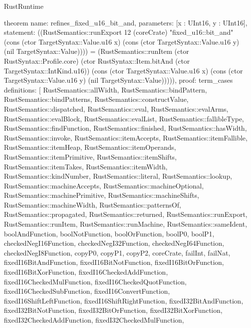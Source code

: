 \begin{lexlean}{RustRuntime}
\begin{semanticmodule}
theorem{
  name: refines_fixed_u16_bit_and,
  parameters: [x : UInt16, y : UInt16],
  statement: ((RustSemantics::runExport 12 (coreCrate) "fixed_u16::bit_and" (cons (ctor TargetSyntax::Value.u16 x) (cons (ctor TargetSyntax::Value.u16 y) (nil TargetSyntax::Value)))) = (RustSemantics::runItem (ctor RustSyntax::Profile.core) (ctor RustSyntax::Item.bitAnd (ctor TargetSyntax::IntKind.u16)) (cons (ctor TargetSyntax::Value.u16 x) (cons (ctor TargetSyntax::Value.u16 y) (nil TargetSyntax::Value))))),
  proof: term_cases{
    definitions: [
      RustSemantics::allWidth,
      RustSemantics::bindPattern,
      RustSemantics::bindPatterns,
      RustSemantics::constructValue,
      RustSemantics::dispatched,
      RustSemantics::eval,
      RustSemantics::evalArms,
      RustSemantics::evalBlock,
      RustSemantics::evalList,
      RustSemantics::fallibleType,
      RustSemantics::findFunction,
      RustSemantics::finished,
      RustSemantics::hasWidth,
      RustSemantics::invoke,
      RustSemantics::itemAccepts,
      RustSemantics::itemFallible,
      RustSemantics::itemHeap,
      RustSemantics::itemOperands,
      RustSemantics::itemPrimitive,
      RustSemantics::itemShifts,
      RustSemantics::itemTakes,
      RustSemantics::itemWidth,
      RustSemantics::kindNumber,
      RustSemantics::literal,
      RustSemantics::lookup,
      RustSemantics::machineAccepts,
      RustSemantics::machineOptional,
      RustSemantics::machinePrimitive,
      RustSemantics::machineShifts,
      RustSemantics::machineWidth,
      RustSemantics::patternsOf,
      RustSemantics::propagated,
      RustSemantics::returned,
      RustSemantics::runExport,
      RustSemantics::runItem,
      RustSemantics::runMachine,
      RustSemantics::sameIdent,
      boolAndFunction,
      boolNotFunction,
      boolOrFunction,
      boolP0,
      boolP1,
      checkedNegI16Function,
      checkedNegI32Function,
      checkedNegI64Function,
      checkedNegI8Function,
      copyP0,
      copyP1,
      copyP2,
      coreCrate,
      failInt,
      failNat,
      fixedI16BitAndFunction,
      fixedI16BitNotFunction,
      fixedI16BitOrFunction,
      fixedI16BitXorFunction,
      fixedI16CheckedAddFunction,
      fixedI16CheckedMulFunction,
      fixedI16CheckedQuotFunction,
      fixedI16CheckedSubFunction,
      fixedI16ConvertFunction,
      fixedI16ShiftLeftFunction,
      fixedI16ShiftRightFunction,
      fixedI32BitAndFunction,
      fixedI32BitNotFunction,
      fixedI32BitOrFunction,
      fixedI32BitXorFunction,
      fixedI32CheckedAddFunction,
      fixedI32CheckedMulFunction,
}}
\end{semanticmodule}
\end{lexlean}
